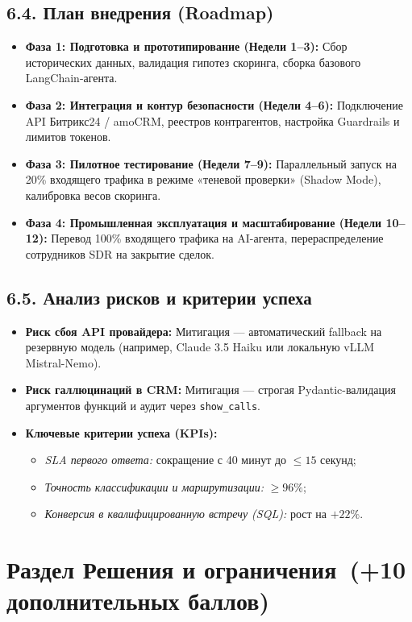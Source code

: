 \documentclass[12pt,a4paper]{article}
\begin{document}
	\subsection*{6.4. План внедрения (Roadmap)}
	\begin{itemize}[noitemsep,topsep=1pt]
		\item \textbf{Фаза 1: Подготовка и прототипирование (Недели 1--3):} Сбор исторических данных, валидация гипотез скоринга, сборка базового LangChain-агента.
		\item \textbf{Фаза 2: Интеграция и контур безопасности (Недели 4--6):} Подключение API Битрикс24 / amoCRM, реестров контрагентов, настройка Guardrails и лимитов токенов.
		\item \textbf{Фаза 3: Пилотное тестирование (Недели 7--9):} Параллельный запуск на 20\% входящего трафика в режиме «теневой проверки» (Shadow Mode), калибровка весов скоринга.
		\item \textbf{Фаза 4: Промышленная эксплуатация и масштабирование (Недели 10--12):} Перевод 100\% входящего трафика на AI-агента, перераспределение сотрудников SDR на закрытие сделок.
	\end{itemize}

	\subsection*{6.5. Анализ рисков и критерии успеха}
	\begin{itemize}[noitemsep,topsep=1pt]
		\item \textbf{Риск сбоя API провайдера:} Митигация --- автоматический fallback на резервную модель (например, Claude 3.5 Haiku или локальную vLLM Mistral-Nemo).
		\item \textbf{Риск галлюцинаций в CRM:} Митигация --- строгая Pydantic-валидация аргументов функций и аудит через \texttt{show\_calls}.
		\item \textbf{Ключевые критерии успеха (KPIs):}
		\begin{itemize}[noitemsep,topsep=1pt]
			\item \textit{SLA первого ответа:} сокращение с 40 минут до $\le 15$ секунд;
			\item \textit{Точность классификации и маршрутизации:} $\ge 96\%$;
			\item \textit{Конверсия в квалифицированную встречу (SQL):} рост на $+22\%$.
		\end{itemize}
	\end{itemize}

	\section*{Раздел \guillemotleft Решения и ограничения\guillemotright\ (+10 дополнительных баллов)}
	
\end{document}
